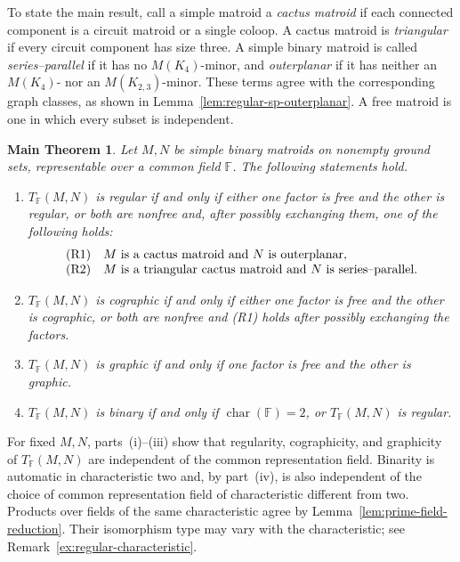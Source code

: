 \documentclass[12pt,a4paper]{article}
\numberwithin{equation}{section}
\newcommand{\F}{\mathbb F}
\newtheorem*{maintheorem}{Main Theorem}
\theoremstyle{definition}
\theoremstyle{remark}
\begin{document}
To state the main result, call a simple matroid a \emph{cactus matroid}
if each connected component is a circuit matroid or a single coloop.
A cactus matroid is \emph{triangular} if every circuit component has
size three.  A simple binary matroid is called \emph{series--parallel} if
it has no \(M(K_4)\)-minor, and \emph{outerplanar} if it has neither
an \(M(K_4)\)- nor an \(M(K_{2,3})\)-minor.  These terms agree with
the corresponding graph classes, as shown in
Lemma~\ref{lem:regular-sp-outerplanar}.  A free matroid is one in
which every subset is independent.

\begin{maintheorem}\label{thm:regular-two-factor}
Let \(M,N\) be simple binary matroids on nonempty ground sets,
representable over a common field \(\F\).  The following statements hold.
\begin{enumerate}[label=\textup{(\roman*)},leftmargin=2.5em]
\item \(T_{\F}(M,N)\) is regular if and only if either one factor is
free and the other is regular, or both are nonfree and, after possibly exchanging them,
one of the following holds:
\[
 \begin{array}{ll}
 \textup{(R1)}&M\text{ is a cactus matroid and }N\text{ is outerplanar},\\
 \textup{(R2)}&M\text{ is a triangular cactus matroid and }
                  N\text{ is series--parallel}.
 \end{array}
\]
\item \(T_{\F}(M,N)\) is cographic if and only if either one factor
is free and the other is cographic, or both are nonfree and
\textup{(R1)} holds after possibly exchanging the factors.
\item \(T_{\F}(M,N)\) is graphic if and only if one factor is free
and the other is graphic.
\item \(T_{\F}(M,N)\) is binary if and only if
\(\operatorname{char}(\F)=2\), or \(T_{\F}(M,N)\) is regular.
\end{enumerate}
\end{maintheorem}

For fixed \(M,N\), parts~\textup{(i)--(iii)} show that regularity,
cographicity, and graphicity of \(T_{\F}(M,N)\) are independent of
the common representation field.  Binarity is automatic in characteristic
two and, by part~\textup{(iv)}, is also independent of the choice of
common representation field of characteristic different from two.
Products over fields of the same characteristic agree by
Lemma~\ref{lem:prime-field-reduction}.  Their isomorphism type may
vary with the characteristic; see
Remark~\ref{ex:regular-characteristic}.
\end{document}
